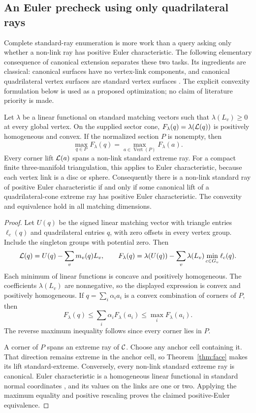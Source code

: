 \subsection{An Euler precheck using only quadrilateral rays}
\label{sec:euler-corners}

Complete standard-ray enumeration is more work than a query asking only
whether a non-link ray has positive Euler characteristic. The following
elementary consequence of canonical extension separates these two tasks.
Its ingredients are classical: canonical surfaces have no vertex-link
components, and canonical quadrilateral vertex surfaces are standard vertex
surfaces \cite[Section 3 and Lemma 4.5]{burtonconversion}. The explicit
convexity formulation below is used as a proposed optimization; no claim
of literature priority is made.

\begin{theorem}
\label{thm:euler-corners}
Let $\lambda$ be a linear functional on standard matching vectors such
that $\lambda(L_v)\ge0$ at every global vertex. On the supplied sector
cone, $F_\lambda(q)=\lambda(\mathcal L(q))$ is positively homogeneous and
convex. If the normalized section $P$ is nonempty, then
\[
 \max_{q\in P}F_\lambda(q)
   =\max_{a\in\operatorname{Vert}(P)}F_\lambda(a).
\]
Every corner lift $\mathcal L(a)$ spans a non-link standard extreme ray.
For a compact finite three-manifold triangulation, this applies to Euler
characteristic, because each vertex link is a disc or sphere. Consequently
there is a non-link standard ray of positive Euler characteristic if and
only if some canonical lift of a quadrilateral-cone extreme ray has
positive Euler characteristic. The convexity and equivalence hold in
all matching dimensions.
\end{theorem}

\begin{proof}
Let $U(q)$ be the signed linear matching vector with triangle entries
$\ell_c(q)$ and quadrilateral entries $q$, with zero offsets in every
vertex group. Include the singleton groups with potential zero. Then
\[
 \mathcal L(q)=U(q)-\sum_v m_v(q)L_v,
 \qquad
 F_\lambda(q)=\lambda(U(q))-
       \sum_v\lambda(L_v)\min_{c\in G_v}\ell_c(q).
\]
Each minimum of linear functions is concave and positively homogeneous.
The coefficients $\lambda(L_v)$ are nonnegative, so the displayed
expression is convex and positively homogeneous. If
$q=\sum_i\alpha_i a_i$ is a convex combination of corners of $P$, then
\[
 F_\lambda(q)\le\sum_i\alpha_i F_\lambda(a_i)
              \le\max_i F_\lambda(a_i).
\]
The reverse maximum inequality follows since every corner lies in $P$.

A corner of $P$ spans an extreme ray of $\mathcal C$. Choose any anchor cell
containing it. That direction remains extreme in the anchor cell, so
Theorem~\ref{thm:face} makes its lift standard-extreme. Conversely, every
non-link standard extreme ray is canonical. Euler characteristic is a
homogeneous linear functional in standard normal coordinates
\cite[Section 2 and Lemma 10]{burtonozlen}, and its values on the links
are one or two. Applying the maximum equality and positive rescaling
proves the claimed positive-Euler equivalence.
\end{proof}

